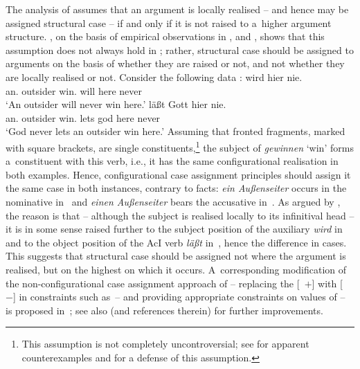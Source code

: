 \documentclass[output=paper,biblatex,babelshorthands,newtxmath,draftmode,colorlinks,citecolor=brown]{langscibook}
\begin{document}
The analysis of \citet{prze:96,Prze99b,Prze99} assumes that an argument is locally realised – and hence may be assigned structural case – if and only if it is not raised to a~higher argument structure.  \citet{Meurers99c,Meurers99b}, on the basis of empirical observations in \citet{Haider90a}, \citet{Grewendorf94a} and \citet{Mueller97c-Eng}, shows that this assumption does not always hold in ; rather, structural case should be assigned to arguments on the basis of whether they are raised or not, and not whether they are locally realised or not.  Consider the following data \citep[294]{Meurers99c}:
\eal
\ex\label{win:ss}
 wird hier nie. \\
    \phtm{[}an.\NOM{} outsider win.\INF{} will here never\\
\glt `An outsider will never win here.'
\ex\label{win:so}
 läßt Gott hier nie. \\
    \phtm{[}an.\ACC{} outsider win.\INF{} lets god here never\\
\glt `God never lets an outsider win here.'
\zl
Assuming that fronted fragments, marked with square brackets, are single constituents,\footnote{This assumption is not completely uncontroversial; see \citet[100–101]{Kiss94} for apparent counterexamples and 
\textcites{Mueller2003b}{Mueller2005d}{MuellerGS}
for a defense of this assumption.} the subject of \emph{gewinnen} `win’ forms a~constituent with this verb, i.e., it has the same configurational realisation in both examples.  Hence, configurational case assignment principles should assign it the same case in both instances, contrary to facts: \emph{ein Au\ss{}enseiter} occurs in the nominative in~ and \emph{einen Au\ss{}enseiter} bears the accusative in~.  As argued by \citet{Meurers99c,Meurers99b}, the reason is that – although the subject is realised locally to its infinitival head – it is in some sense raised further to the subject position of the auxiliary \emph{wird} in~ and to the object position of the AcI verb \emph{l\"a\ss{}t} in~, hence the difference in cases.  This suggests that structural case should be assigned not where the argument is realised, but on the highest  on which it occurs.  A~corresponding modification of the non-configurational case assignment approach of \citet{prze:96,Prze99b,Prze99} – replacing the [~$+$] with [~$-$] in constraints such as~– and providing appropriate constraints on values of  – is proposed in~\citet[93–95]{Prze99b}; see also \citet[Section~17.4]{MuellerLehrbuch3} (and references therein) for further improvements.
\end{document}
